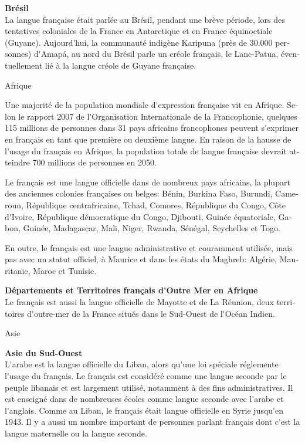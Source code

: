 \begin{french}
\begin{multicols}{2}
{\bf Brésil}\\
La langue française était parlée au Brésil, pendant une brève période,
lors des tentatives coloniales de la France en Antarctique et en
France équinoctiale (Guyane). Aujourd{\mbox '}hui, la communauté indigène
Karipuna (près de 30.000 personnes) d{\mbox '}Amapá, au nord du Brésil
parle un créole français, le Lanc-Patua, éventuellement lié à la
langue créole de Guyane française.

\begin{center}
{\sc Afrique}
\end{center}

Une majorité de la population mondiale d{\mbox '}expression française
vit en Afrique. Selon le rapport 2007 de l{\mbox '}Organisation
Internationale de la Francophonie, quelques 115 millions de personnes
dans 31 pays africains francophones peuvent s{\mbox '}exprimer en
français en tant que première ou deuxième langue. En raison de la
hausse de l'usage du français en Afrique, la population totale de langue
française devrait atteindre 700 millions de personnes en 2050.

Le français est une langue officielle dans de nombreux pays africains,
la plupart des anciennes colonies françaises ou belges: Bénin, Burkina
Faso, Burundi, Cameroun, République centrafricaine, Tchad, Comores,
République du Congo, Côte d{\mbox '}Ivoire, République démocratique du
Congo, Djibouti, Guinée équatoriale, Gabon, Guinée, Madagascar, Mali,
Niger, Rwanda, Sénégal, Seychelles et Togo.

En outre, le français est une langue administrative et couramment
utilisée, mais pas avec un statut officiel, à Maurice et dans les
états du Maghreb: Algérie, Mauritanie, Maroc et Tunisie.

{\bf Départements et Territoires français d{\mbox '}Outre Mer en Afrique}\\
Le français est aussi la langue officielle de Mayotte et de La
Réunion, deux territoires d{\mbox '}outre-mer de la France situés dans
le Sud-Ouest de l{\mbox '}Océan Indien.

\begin{center}
{\sc Asie}
\end{center}

{\bf Asie du Sud-Ouest}\\ 
L{\mbox '}arabe est la langue officielle du Liban, alors qu{\mbox '}une 
loi spéciale réglemente l{\mbox '}usage du français. Le
français est considéré comme une langue seconde par le peuple libanais
et est largement utilisé, notamment à des fins administratives. Il est
enseigné dans de nombreuses écoles comme langue seconde avec l{\mbox
 '}arabe et l{\mbox '}anglais. Comme au Liban, le français était
langue officielle en Syrie jusqu{\mbox '}en 1943. Il y a aussi un
nombre important de personnes parlant français dont c{\mbox '}est la
langue maternelle ou la langue seconde.


\end{multicols}
\end{french}

